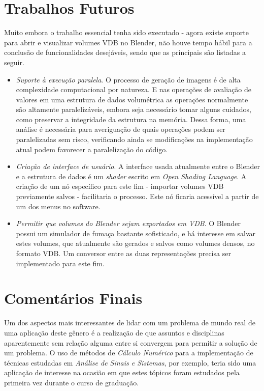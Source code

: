 \section{Trabalhos Futuros}

Muito embora o trabalho essencial tenha sido executado - agora existe suporte para abrir e visualizar volumes VDB no Blender, não houve tempo hábil para a conclusão de funcionalidades desejáveis, sendo que as principais são listadas a seguir.

\begin{itemize}
\item \emph{Suporte à execução paralela}.
O processo de geração de imagens é de alta complexidade computacional por natureza. E nas operações de avaliação de valores em uma estrutura de dados volumétrica as operações normalmente são altamente paralelizáveis, embora seja necessário tomar alguns cuidados, como preservar a integridade da estrutura na memória. Dessa forma, uma análise é necessária para averiguação de quais operações podem ser paralelizadas sem risco, verificando ainda se modificações na implementação atual podem favorecer a paralelização do código.

\item \emph{Criação de interface de usuário}. A interface usada atualmente entre o Blender e a estrutura de dados é um {\it shader} escrito em \emph{Open Shading Language}. A criação de um nó específico para este fim - importar volumes VDB previamente salvos - facilitaria o processo. Este nó ficaria acessível a partir de um dos menus no software.

\item \emph{Permitir que volumes do Blender sejam exportados em VDB}. O Blender possui um simulador de fumaça bastante sofisticado, e há interesse em salvar estes volumes, que atualmente são gerados e salvos como volumes densos, no formato VDB. Um conversor entre as duas representações precisa ser implementado para este fim.

\end{itemize}

\section{Comentários Finais}

Um dos aspectos mais interessantes de lidar com um problema de mundo real de uma aplicação deste gênero é a realização de que assuntos e disciplinas aparentemente sem relação alguma entre si convergem para permitir a solução de um problema. O uso de métodos de \emph{Cálculo Numérico} para a implementação de técnicas estudadas em \emph{Análise de Sinais e Sistemas}, por exemplo, teria sido uma aplicação de interesse na ocasião em que estes tópicos foram estudados pela primeira vez durante o curso de graduação. \\

